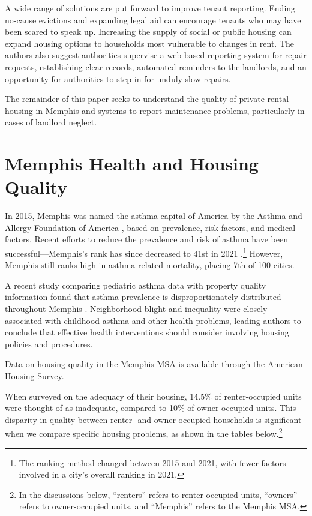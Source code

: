 \documentclass[
]{book}
\begin{document}
A wide range of solutions are put forward to improve tenant reporting. Ending no-cause evictions and expanding legal aid can encourage tenants who may have been scared to speak up. Increasing the supply of social or public housing can expand housing options to households most vulnerable to changes in rent. The authors also suggest authorities supervise a web-based reporting system for repair requests, establishing clear records, automated reminders to the landlords, and an opportunity for authorities to step in for unduly slow repairs.

The remainder of this paper seeks to understand the quality of private rental housing in Memphis and systems to report maintenance problems, particularly in cases of landlord neglect.

\hypertarget{memphis-health-and-housing-quality}{%
\section{Memphis Health and Housing Quality}\label{memphis-health-and-housing-quality}}

In 2015, Memphis was named the asthma capital of America by the Asthma and Allergy Foundation of America \citep{aafa2015}, based on prevalence, risk factors, and medical factors. Recent efforts to reduce the prevalence and risk of asthma have been successful---Memphis's rank has since decreased to 41st in 2021 \citep{aafa2021}.\footnote{The ranking method changed between 2015 and 2021, with fewer factors involved in a city's overall ranking in 2021.} However, Memphis still ranks high in asthma-related mortality, placing 7th of 100 cities.

A recent study comparing pediatric asthma data with property quality information found that asthma prevalence is disproportionately distributed throughout Memphis \citep{shin2018}. Neighborhood blight and inequality were closely associated with childhood asthma and other health problems, leading authors to conclude that effective health interventions should consider involving housing policies and procedures.

Data on housing quality in the Memphis MSA is available through the \href{https://www.census.gov/programs-surveys/ahs.html}{American Housing Survey}.

When surveyed on the adequacy of their housing, 14.5\% of renter-occupied units were thought of as inadequate, compared to 10\% of owner-occupied units. This disparity in quality between renter- and owner-occupied households is significant when we compare specific housing problems, as shown in the tables below.\footnote{In the discussions below, ``renters'' refers to renter-occupied units, ``owners'' refers to owner-occupied units, and ``Memphis'' refers to the Memphis MSA.}
\end{document}
